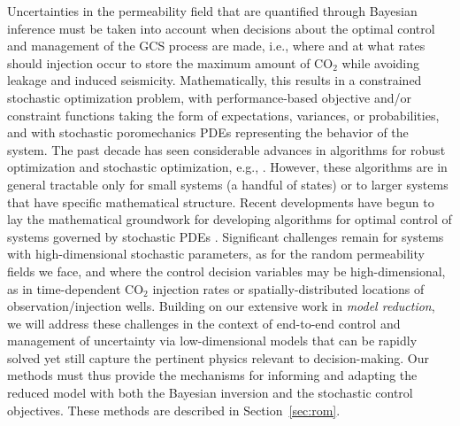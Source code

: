 \documentclass[11pt,final]{article}%
\def\CO2{CO$_2$}
\begin{document}
Uncertainties in the permeability field that are quantified through
Bayesian inference must be taken into account when decisions about the
optimal control and management of the GCS process are made, i.e.,
where and at what rates should injection occur to store the maximum
amount of \CO2 while avoiding leakage and induced seismicity. 
Mathematically, this results in a  constrained stochastic optimization
problem, 
with performance-based objective and/or constraint functions taking
the form of expectations, variances, or probabilities, and with
stochastic poromechanics PDEs representing the behavior of the
system. The past decade has seen considerable advances in algorithms
for robust optimization and stochastic optimization, e.g.,
\cite{bertsimas2004price, ben2006extending, birge1997introduction,
  shapiro2009lectures}. However, these algorithms are in general
tractable only for small systems (a handful of states) or to larger
systems that have specific mathematical structure.
Recent developments have begun to lay the mathematical groundwork for
developing algorithms for optimal control of systems governed by
stochastic PDEs \cite{GunzburgerLeeLee11, GunzburgerMing11,
  Kouri12}. Significant challenges remain for systems with
high-dimensional stochastic parameters, as for the random
permeability fields we face, and where the control decision variables
may be high-dimensional, as in time-dependent \CO2 injection rates or
spatially-distributed locations of observation/injection wells.
%
Building on our extensive work in {\em model reduction}, we will
address these challenges in the context of end-to-end control and
management of uncertainty via low-dimensional models that can be
rapidly solved yet still capture the pertinent physics relevant to
decision-making. Our methods must thus provide the mechanisms for
informing and adapting the reduced model with both the Bayesian
inversion and the stochastic control objectives. These methods are
described in Section~\ref{sec:rom}.
\end{document}
